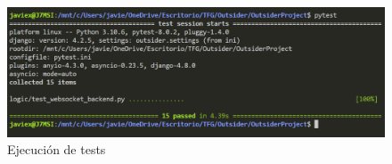 \begin{figure}[h]
	\centering
	\includegraphics[width=\textwidth,clip=true]{res_testing.png}
	\caption{Ejecución de tests}
	\label{fig:res_testing}
\end{figure}
